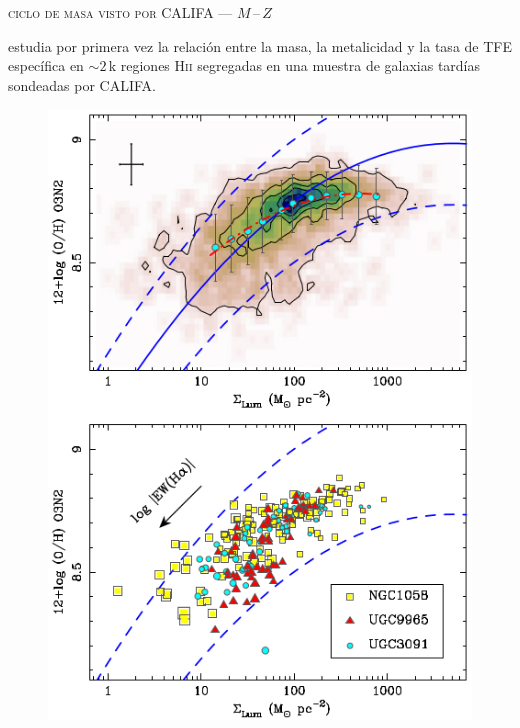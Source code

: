 \documentclass[xcolor=dvipsnames,fleqn,hyperref={colorlinks,citecolor=black,linkcolor=black,urlcolor=black}]{beamer}
\begin{document}
\begin{frame}{\textsc{ciclo de masa visto por CALIFA --- $M\,$--$\,Z$}}

\citet{Rosales2012} estudia por primera vez la relación entre la masa, la metalicidad y la tasa de
TFE específica en $\sim2\,$k regiones H\textsc{ii} segregadas en una muestra de galaxias tardías
sondeadas por CALIFA.
\begin{figure}
\includegraphics[scale=1]{img/rosales-ortega2012-1}
\end{figure}
\end{frame}
\end{document}
